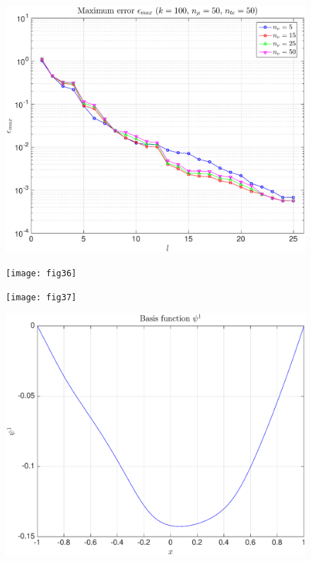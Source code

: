 \documentclass[11pt,a4paper]{article}
\theoremstyle{definition}
\theoremstyle{theorem}
\begin{document}
	\begin{figure}
		\center
		\includegraphics[scale=0.5]{fig35}
		\caption{}
	\end{figure}
	
	\begin{figure}
		\center
		\texttt{[image: fig36]}
		\caption{}
	\end{figure}
	
	\begin{figure}
		\center
		\texttt{[image: fig37]}
		\caption{}
	\end{figure}
	
	\begin{figure}
		\center
		\includegraphics[scale=0.5]{fig38}
		\caption{}
	\end{figure}
	
\end{document}
